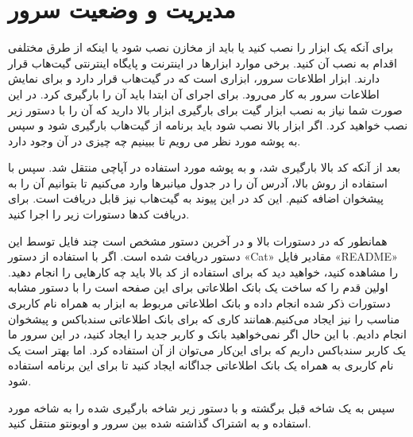 \chapter{مدیریت و وضعیت سرور}
برای آنکه یک ابزار را نصب کنید یا باید از مخازن نصب شود یا اینکه از طرق مختلفی اقدام به نصب آن کنید. برخی موارد ابزارها در اینترنت و پایگاه اینترنتی گیت‌هاب قرار دارند. ابزار اطلاعات سرور، ابزاری است که در گیت‌هاب قرار دارد و برای نمایش اطلاعات سرور به کار می‌رود. برای اجرای آن ابتدا باید آن را بارگیری کرد. در این صورت شما نیاز به نصب ابزار گیت برای بارگیری ابزار بالا دارید که آن را با دستور زیر نصب خواهید کرد. اگر ابزار بالا نصب شود باید برنامه از گیت‌هاب بارگیری شود و سپس به پوشه مورد نظر می ‌رویم تا ببینیم چه چیزی در آن وجود دارد.

بعد از آنکه کد بالا بارگیری شد، و به پوشه مورد استفاده در آپاچی منتقل شد. سپس با استفاده از روش بالا، آدرس آن را در جدول میانبرها وارد می‌کنیم تا بتوانیم آن را به پیشخوان اضافه کنیم. این کد در این پیوند به گیت‌هاب نیز قابل دریافت است. برای دریافت کدها دستورات زیر را اجرا کنید.
\newline

\begin{latin}  
    
\end{latin}

همانطور که در دستورات بالا و در آخرین دستور مشخص است چند فایل توسط این دستور دریافت شده است. اگر با استفاده از دستور «Cat» مقادیر فایل «README» را مشاهده کنید، خواهید دید که برای استفاده از کد بالا باید چه کارهایی را انجام دهید. اولین قدم را که ساخت یک بانک اطلاعاتی برای این  صفحه است را با دستور مشابه دستورات ذکر شده انجام داده و بانک اطلاعاتی مربوط به ابزار به همراه نام کاربری مناسب را نیز ایجاد می‌کنیم.همانند کاری که برای بانک اطلاعاتی سندباکس و پیشخوان انجام دادیم.  با این حال اگر نمی‌خواهید بانک و کاربر جدید را ایجاد کنید، در این سرور ما یک کاربر سندباکس داریم که برای این‌کار می‌توان از آن استفاده کرد. اما بهتر است یک نام کاربری به همراه یک بانک اطلاعاتی جداگانه ایجاد کنید تا برای این برنامه استفاده شود.\newline

\begin{latin}  
    
\end{latin}

سپس به یک شاخه قبل برگشته و با دستور زیر شاخه بارگیری شده را به شاخه مورد استفاده و به اشتراک گذاشته شده بین سرور و اوبونتو منتقل کنید.
\newline

